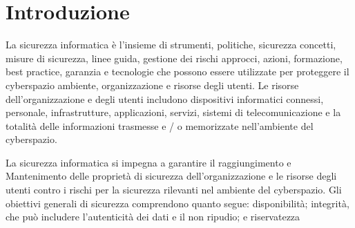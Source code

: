 \setchapterpreamble[u]{\margintoc}
\chapter{Introduzione}

La sicurezza informatica è l'insieme di strumenti, politiche, sicurezza concetti, misure di sicurezza, linee guida, gestione dei rischi approcci, azioni, formazione, best practice, garanzia e tecnologie che possono essere utilizzate per proteggere il cyberspazio ambiente, organizzazione e risorse degli utenti. Le risorse dell'organizzazione e degli utenti includono dispositivi informatici connessi, personale, infrastrutture, applicazioni, servizi, sistemi di telecomunicazione e la totalità delle informazioni trasmesse e / o memorizzate nell'ambiente del cyberspazio.

La sicurezza informatica si impegna a garantire il raggiungimento e Mantenimento delle proprietà di sicurezza dell'organizzazione e le risorse degli utenti contro i rischi per la sicurezza rilevanti nel ambiente del cyberspazio. Gli obiettivi generali di sicurezza comprendono quanto segue: disponibilità; integrità, che può includere l'autenticità dei dati e il non ripudio; e riservatezza